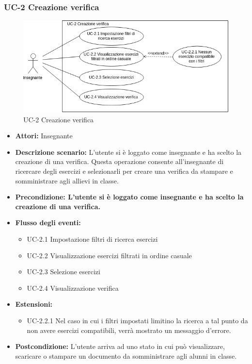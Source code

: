 \subsubsection{UC-2 Creazione verifica}
\begin{figure}[htbp]
	\centering
	\includegraphics[scale=0.7]{images/UC-2.png}
	\caption{UC-2 Creazione verifica}
\end{figure}
\begin{itemize}
		\item \textbf{Attori: } Insegnante
		\item \textbf{Descrizione scenario: }L'utente si è loggato come insegnante e ha scelto la creazione di una verifica. Questa operazione consente all'insegnante di ricercare degli esercizi e selezionarli per creare una verifica da stampare e somministrare agli allievi in classe.
		\item \textbf{Precondizione: L'utente si è loggato come insegnante e ha scelto la creazione di una verifica. }
		\item \textbf{Flusso degli eventi: }
		\begin{itemize}
		\item UC-2.1 Impostazione filtri di ricerca esercizi
		\item UC-2.2 Visualizzazione esercizi filtrati in ordine casuale
		\item UC-2.3 Selezione esercizi
		\item UC-2.4 Visualizzazione verifica
		\end{itemize}
		\item \textbf{Estensioni: }
		\begin{itemize}
		\item UC-2.2.1 Nel caso in cui i filtri impostati limitino la ricerca a tal punto da non avere esercizi compatibili, verrà mostrato un messaggio d'errore. 
		\end{itemize} 
		\item \textbf{Postcondizione: }L'utente arriva ad uno stato in cui può visualizzare, scaricare o stampare un documento da somministrare agli alunni in classe.
\end{itemize}
\newpage

